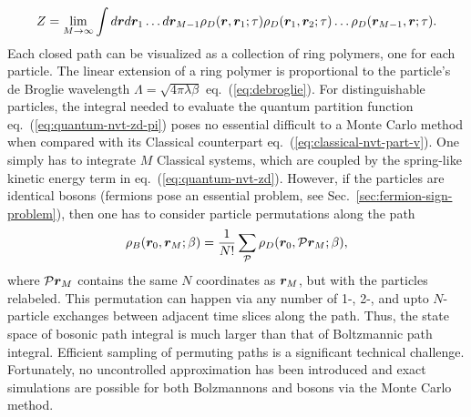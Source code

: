 \begin{align} \label{eq:quantum-nvt-zd-pi}
Z=\lim\limits_{M\rightarrow\infty} \int d\boldsymbol{r} d\boldsymbol{r}_1\dots d\boldsymbol{r}_{M-1}
\rho_D(\boldsymbol{r},\boldsymbol{r}_1;\tau)\rho_D(\boldsymbol{r}_1,\boldsymbol{r}_2;\tau)\dots\rho_D(\boldsymbol{r}_{M-1},\boldsymbol{r};\tau).
\end{align}
Each closed path can be visualized as a collection of ring polymers, one for each particle. The linear extension of a ring polymer is proportional to the particle's de Broglie wavelength $\Lambda=\sqrt{4\pi\lambda\beta}$ eq.~(\ref{eq:debroglie}).
For distinguishable particles, the integral needed to evaluate the quantum partition function eq.~(\ref{eq:quantum-nvt-zd-pi}) poses no essential difficult to a Monte Carlo method when compared with its Classical counterpart eq.~(\ref{eq:classical-nvt-part-v}). One simply has to integrate $M$ Classical systems, which are coupled by the spring-like kinetic energy term in eq.~(\ref{eq:quantum-nvt-zd}).
However, if the particles are identical bosons (fermions pose an essential problem, see Sec.~\ref{sec:fermion-sign-problem}), then one has to consider particle permutations along the path
\begin{align}
\rho_B(\boldsymbol{r}_0,\boldsymbol{r}_M;\beta) = \frac{1}{N!}\sum\limits_{\mathcal{P}} \rho_D(\boldsymbol{r}_0, \mathcal{P}\boldsymbol{r}_M;\beta),
\end{align}
where $\mathcal{P}\boldsymbol{r}_M$ contains the same $N$ coordinates as $\boldsymbol{r}_M$, but with the particles relabeled. This permutation can happen via any number of 1-, 2-, and upto $N$-particle exchanges between adjacent time slices along the path. Thus, the state space of bosonic path integral is much larger than that of Boltzmannic path integral. Efficient sampling of permuting paths is a significant technical challenge. Fortunately, no uncontrolled approximation has been introduced and exact simulations are possible for both Bolzmannons and bosons via the Monte Carlo method.

